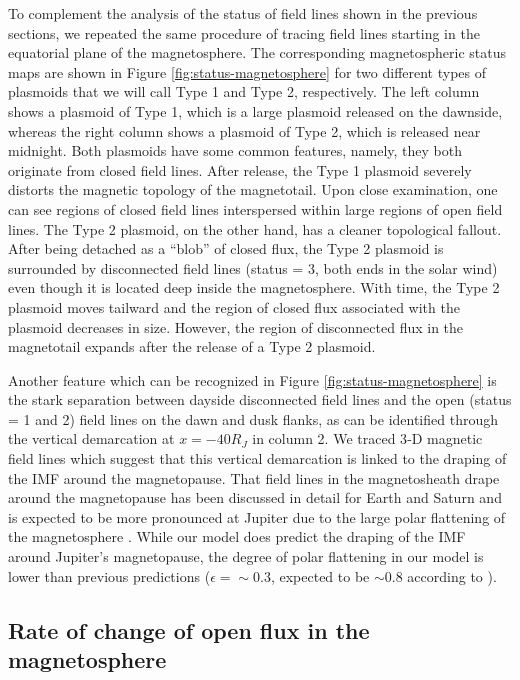 To complement the analysis of the status of field lines shown in the previous sections, we repeated the same procedure of tracing field lines starting in the equatorial plane of the magnetosphere. The corresponding magnetospheric status maps are shown in Figure \ref{fig:status-magnetosphere} for two different types of plasmoids that we will call Type 1 and Type 2, respectively. The left column shows a plasmoid of Type 1, which is a large plasmoid released on the dawnside, whereas the right column shows a plasmoid of Type 2, which is released near midnight. Both plasmoids have some common features, namely, they both originate from closed field lines. After release, the Type 1 plasmoid severely distorts the magnetic topology of the magnetotail. Upon close examination, one can see regions of closed field lines interspersed within large regions of open field lines. The Type 2 plasmoid, on the other hand, has a cleaner topological fallout. After being detached as a “blob” of closed flux, the Type 2 plasmoid is surrounded by disconnected field lines (status = 3, both ends in the solar wind) even though it is located deep inside the magnetosphere. With time, the Type 2 plasmoid moves tailward and the region of closed flux associated with the plasmoid decreases in size. However, the region of disconnected flux in the magnetotail expands after the release of a Type 2 plasmoid. 

Another feature which can be recognized in Figure \ref{fig:status-magnetosphere} is the stark separation between dayside disconnected field lines and the open (status = 1 and 2) field lines on the dawn and dusk flanks, as can be identified through the vertical demarcation at $x = -40 R_J$ in column 2. We traced 3‐D magnetic field lines which suggest that this vertical demarcation is linked to the draping of the IMF around the magnetopause. That field lines in the magnetosheath drape around the magnetopause has been discussed in detail for Earth and Saturn \cite{Crooker1985,Sulaiman2014,Sulaiman2017Large-scaleMagnetosphere} and is expected to be more pronounced at Jupiter due to the large polar flattening of the magnetosphere \cite{Erkaev1996,Farrugia1998,Slavin1985}. While our model does predict the draping of the IMF around Jupiter's magnetopause, the degree of polar flattening in our model is lower than previous predictions ($\epsilon=\sim$0.3, expected to be $\sim$0.8 according to ). 

\subsection{Rate of change of open flux in the magnetosphere}

